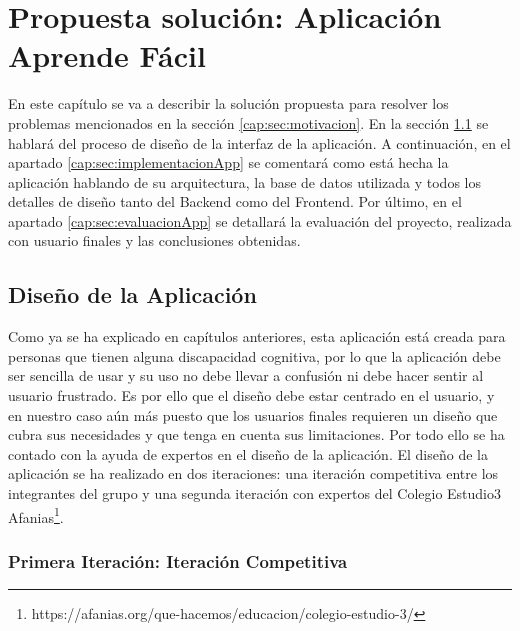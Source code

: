 \chapter{Propuesta solución: Aplicación Aprende Fácil}
\label{cap:aprendeFacil}

En este capítulo se va a describir la solución propuesta para resolver los problemas mencionados en la sección \ref{cap:sec:motivacion}. En la sección \ref{cap:sec:disenioInterfaz} se hablará del proceso de diseño de la interfaz de la aplicación. A continuación, en el apartado \ref{cap:sec:implementacionApp} se comentará como está hecha la aplicación hablando de su arquitectura, la base de datos utilizada y todos los detalles de diseño tanto del Backend como del Frontend. Por último, en el apartado \ref{cap:sec:evaluacionApp} se detallará la evaluación del proyecto, realizada con usuario finales y las conclusiones obtenidas.

\section{Diseño de la Aplicación}
\label{cap:sec:disenioInterfaz}
Como ya se ha explicado en capítulos anteriores, esta aplicación está creada para personas que tienen alguna discapacidad cognitiva, por lo que la aplicación debe ser sencilla de usar y su uso no debe llevar a confusión ni debe hacer sentir al usuario frustrado. 
Es por ello que el diseño debe estar centrado en el usuario, y en nuestro caso aún más puesto que los usuarios finales requieren un diseño que cubra sus necesidades y que tenga en cuenta sus limitaciones.  Por todo ello se ha contado con la ayuda de expertos en el diseño de la aplicación.
El diseño de la aplicación se ha realizado en dos iteraciones: una iteración competitiva entre los integrantes del grupo y una segunda iteración con expertos del Colegio Estudio3 Afanias\footnote{https://afanias.org/que-hacemos/educacion/colegio-estudio-3/}. 


\subsection{Primera Iteración: Iteración Competitiva}
\label{cap:subsec:iteracionCompetitiva}


